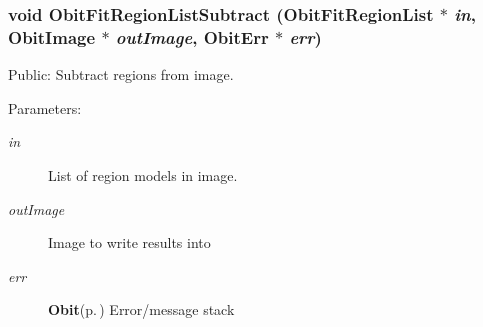 \subsubsection{\setlength{\rightskip}{0pt plus 5cm}void Obit\-Fit\-Region\-List\-Subtract ({\bf Obit\-Fit\-Region\-List} $\ast$ {\em in}, {\bf Obit\-Image} $\ast$ {\em out\-Image}, {\bf Obit\-Err} $\ast$ {\em err})}\label{ObitFitRegionList_8h_a11}


Public: Subtract regions from image. 

\begin{Desc}
\item[Parameters:]
\begin{description}
\item[{\em in}]List of region models in image. \item[{\em out\-Image}]Image to write results into \item[{\em err}]{\bf Obit}{\rm (p.\,\pageref{structObit})} Error/message stack \end{description}
\end{Desc}
